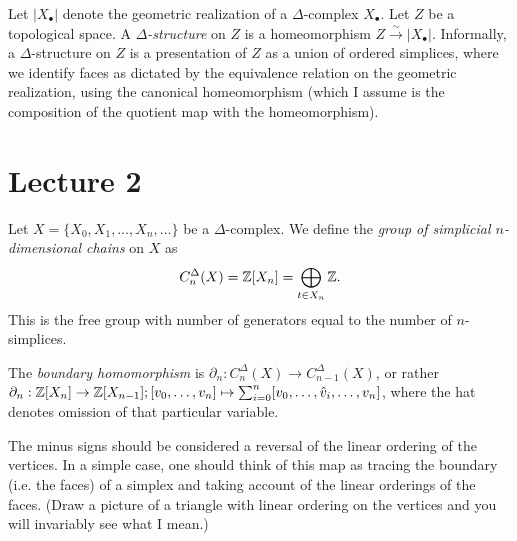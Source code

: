\begin{definition}
Let $\lvert X_\bullet \rvert$ denote the geometric realization of a $\Delta$-complex $X_\bullet$. Let $Z$ be a topological space. A \emph{$\Delta$-structure} on $Z$ is a homeomorphism $Z\overset{\sim}{\to} \lvert X_\bullet \rvert$. Informally, a $\Delta$-structure on $Z$ is a presentation of $Z$ as a union of ordered simplices, where we identify faces as dictated by the equivalence relation on the geometric realization, using the canonical homeomorphism (which I assume is the composition of the quotient map with the homeomorphism). 
\end{definition}

\newpage

\section{Lecture 2}
\begin{definition}
Let $X = \{X_0, X_1, \ldots, X_n, \ldots\}$ be a $\Delta$-complex. We define the \emph{group of simplicial $n$-dimensional chains} on $X$ as 
\[
C^\Delta_n(X) = \mathbb{Z}[X_n] = \bigoplus_{t \in X_n}\mathbb{Z}.
\]
This is the free group with number of generators equal to the number of $n$-simplices.
\end{definition}
\begin{definition}
The \emph{boundary homomorphism} is $\partial_n: C^\Delta_n (X) \to C^\Delta_{n-1} (X)$, or rather $\partial_n: \mathbb{Z}[X_n] \to \mathbb{Z}[X_{n-1}]; [v_0, \ldots, v_n] \mapsto \sum_{i = 0}^n [v_0, \ldots, \hat{v}_i, \ldots, v_n]$, where the hat denotes omission of that particular variable.
\end{definition}
\begin{remark}
The minus signs should be considered a reversal of the linear ordering of the vertices. In a simple case, one should think of this map as tracing the boundary (i.e. the faces) of a simplex and taking account of the linear orderings of the faces. (Draw a picture of a triangle with linear ordering on the vertices and you will invariably see what I mean.)
\end{remark}

